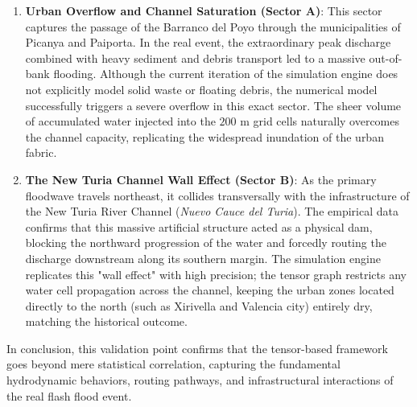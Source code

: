 \begin{enumerate}[label=\Alph*.]
    \item \textbf{Urban Overflow and Channel Saturation (Sector A)}: This sector captures the passage of the Barranco del Poyo through the 
    municipalities of Picanya and Paiporta. In the real event, the extraordinary peak discharge combined with heavy sediment and debris 
    transport led to a massive out-of-bank flooding. Although the current iteration of the simulation engine does not explicitly model 
    solid waste or floating debris, the numerical model successfully triggers a severe overflow in this exact sector. The sheer volume of 
    accumulated water injected into the $200\text{ m}$ grid cells naturally overcomes the channel capacity, replicating the widespread 
    inundation of the urban fabric.
    
    \item \textbf{The New Turia Channel Wall Effect (Sector B)}: As the primary floodwave travels northeast, it collides transversally 
    with the infrastructure of the New Turia River Channel (\textit{Nuevo Cauce del Turia}). The empirical data confirms that this massive 
    artificial structure acted as a physical dam, blocking the northward progression of the water and forcedly routing the discharge 
    downstream along its southern margin. The simulation engine replicates this "wall effect" with high precision; the tensor graph 
    restricts any water cell propagation across the channel, keeping the urban zones located directly to the north (such as Xirivella and 
    Valencia city) entirely dry, matching the historical outcome.
\end{enumerate}

In conclusion, this validation point confirms that the tensor-based framework goes beyond mere statistical correlation, capturing the 
fundamental hydrodynamic behaviors, routing pathways, and infrastructural interactions of the real flash flood event.
